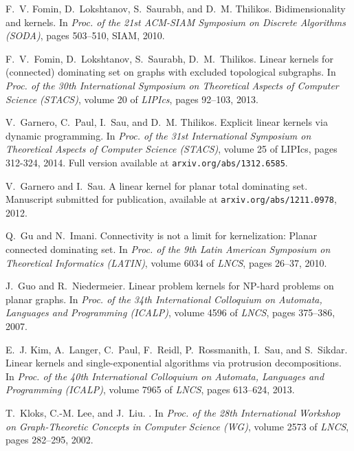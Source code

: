 \documentclass[a4paper,11pt]{article}
\renewenvironment{thebibliography}[1]{\begin{oldthebibliography}{#1}\setlength{\parskip}{0.4ex}\setlength{\itemsep}{0.4ex}}{\end{oldthebibliography}}
\begin{document}
{\begin{thebibliography}{10}
F.~V. Fomin, D.~Lokshtanov, S.~Saurabh, and D.~M. Thilikos.
\newblock Bidimensionality and kernels.
\newblock In {\em Proc. of the 21st ACM-SIAM Symposium on Discrete Algorithms
  (SODA)}, pages 503--510, SIAM, 2010.

F.~V.~Fomin, D.~Lokshtanov, S.~Saurabh, D.~M.~Thilikos.
\newblock Linear kernels for (connected) dominating set on graphs with excluded topological subgraphs.
\newblock  In {\em Proc. of the 30th International Symposium on Theoretical Aspects of Computer Science (STACS)}, volume 20 of {\em LIPIcs}, pages
  92--103, 2013.

V.~Garnero, C.~Paul, I.~Sau, and D.~M. Thilikos.
\newblock Explicit linear kernels via dynamic programming.
\newblock In \emph{Proc. of the 31st International Symposium on Theoretical Aspects of Computer Science (STACS)}, volume 25 of LIPIcs, pages
312-324, 2014. Full version available at \texttt{arxiv.org/abs/1312.6585}.


V.~Garnero and I.~Sau.
\newblock A linear kernel for planar total dominating set.
\newblock Manuscript submitted for publication, available at \texttt{arxiv.org/abs/1211.0978}, 2012.

Q.~Gu and N.~Imani.
\newblock Connectivity is not a limit for kernelization: Planar connected
  dominating set.
\newblock In {\em Proc. of the 9th Latin American Symposium on Theoretical
  Informatics (LATIN)}, volume 6034 of {\em LNCS}, pages 26--37, 2010.

J.~Guo and R.~Niedermeier.
\newblock Linear problem kernels for {NP}-hard problems on planar graphs.
\newblock In {\em Proc. of the 34th International Colloquium on Automata,
  Languages and Programming (ICALP)}, volume 4596 of {\em LNCS}, pages
  375--386, 2007.

E.~J. Kim, A.~Langer, C.~Paul, F.~Reidl, P.~Rossmanith, I.~Sau, and S.~Sikdar.
\newblock Linear kernels and single-exponential algorithms via protrusion
  decompositions.
\newblock In {\em Proc. of the 40th International Colloquium on Automata,
  Languages and Programming (ICALP)}, volume 7965 of {\em LNCS}, pages
  613--624, 2013.

T.~Kloks, C.-M. Lee, and J.~Liu.
.
\newblock In {\em Proc. of the 28th International Workshop on Graph-Theoretic
  Concepts in Computer Science (WG)}, volume 2573 of {\em LNCS}, pages
  282--295, 2002.


\end{thebibliography}}
\end{document}
